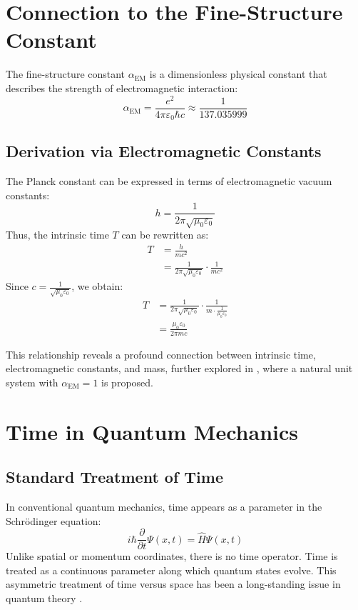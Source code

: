 \documentclass[12pt,a4paper]{article}
\newcommand{\alphaEM}{\alpha_{\text{EM}}}
\begin{document}
	\section{Connection to the Fine-Structure Constant}
	The fine-structure constant \( \alphaEM \) is a dimensionless physical constant that describes the strength of electromagnetic interaction:
	\begin{equation}
		\alphaEM = \frac{e^2}{4\pi\varepsilon_0\hbar c} \approx \frac{1}{137.035999}
	\end{equation}
	
	\subsection{Derivation via Electromagnetic Constants}
	The Planck constant can be expressed in terms of electromagnetic vacuum constants:
	\begin{equation}
		h = \frac{1}{2\pi\sqrt{\mu_0\varepsilon_0}}
	\end{equation}
	Thus, the intrinsic time \( T \) can be rewritten as:
	\begin{align}
		T &= \frac{h}{mc^2} \\
		&= \frac{1}{2\pi\sqrt{\mu_0\varepsilon_0}} \cdot \frac{1}{mc^2}
	\end{align}
	Since \( c = \frac{1}{\sqrt{\mu_0\varepsilon_0}} \), we obtain:
	\begin{align}
		T &= \frac{1}{2\pi\sqrt{\mu_0\varepsilon_0}} \cdot \frac{1}{m \cdot \frac{1}{\mu_0\varepsilon_0}} \\
		&= \frac{\mu_0\varepsilon_0}{2\pi m c}
	\end{align}
	
	This relationship reveals a profound connection between intrinsic time, electromagnetic constants, and mass, further explored in \cite{pascher_alpha_2025}, where a natural unit system with \(\alphaEM = 1\) is proposed.
	
	\section{Time in Quantum Mechanics}
	\subsection{Standard Treatment of Time}
	In conventional quantum mechanics, time appears as a parameter in the Schrödinger equation:
	\begin{equation}
		i\hbar \frac{\partial}{\partial t}\Psi(x,t) = \hat{H}\Psi(x,t)
	\end{equation}
	Unlike spatial or momentum coordinates, there is no time operator. Time is treated as a continuous parameter along which quantum states evolve. This asymmetric treatment of time versus space has been a long-standing issue in quantum theory \cite{pascher_erweiterung_2025}.
	
\end{document}
